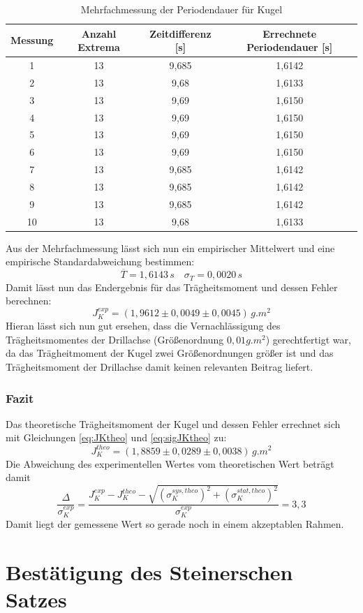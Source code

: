 \documentclass[12pt,a4paper]{article}
\begin{document}
\begin{table}
\caption{Mehrfachmessung der Periodendauer für Kugel}
\label{tab:Kugel_Periodendauern}
\begin{center}
\begin{tabular}{|c|c|c|c|}
\hline 
Messung & Anzahl Extrema & Zeitdifferenz [s] & Errechnete Periodendauer [s] \\ 
\hline 
1 & 13 & 9,685 & 1,6142 \\ 
\hline 
2 & 13 & 9,68 & 1,6133 \\ 
\hline 
3 & 13 & 9,69 & 1,6150 \\ 
\hline 
4 & 13 & 9,69 & 1,6150 \\ 
\hline 
5 & 13 & 9,69 & 1,6150 \\ 
\hline 
6 & 13 & 9,69 & 1,6150 \\ 
\hline 
7 & 13 & 9,685 & 1,6142 \\ 
\hline 
8 & 13 & 9,685 & 1,6142 \\ 
\hline 
9 & 13 & 9,685 & 1,6142 \\ 
\hline 
10 & 13 & 9,68 & 1,6133 \\ 
\hline 
\end{tabular} 
\end{center}
\end{table}

Aus der Mehrfachmessung lässt sich nun ein empirischer Mittelwert und eine empirische Standardabweichung bestimmen:
\[\overline{T} = 1,6143 \,s \quad \sigma_T = 0,0020 \, s \]
Damit lässt nun das Endergebnis für das Trägheitsmoment und dessen Fehler berechnen:
\[J_K^{exp} = (1,9612 \pm 0,0049 \pm 0,0045) \, \si{g.m ^2} \]
Hieran lässt sich nun gut ersehen, dass die Vernachlässigung des Trägheitsmomentes der Drillachse (Größenordnung $0,01\si{g.m ^2}$) gerechtfertigt war, da das Trägheitmoment der Kugel zwei Größenordnungen größer ist und das Trägheitsmoment der Drillachse damit keinen relevanten Beitrag liefert.

\subsubsection{Fazit}
Das theoretische Trägheitsmoment der Kugel und dessen Fehler errechnet sich mit Gleichungen \ref{eq:JKtheo} und \ref{eq:sigJKtheo} zu:
\[J_K^{theo} = (1,8859 \pm 0,0289 \pm 0,0038) \, \si{g.m ^2} \]
Die Abweichung des experimentellen Wertes vom theoretischen Wert beträgt damit 
\[\dfrac{\Delta}{\sigma _K^{exp}} = \dfrac{J_K^{exp} - J_K^{theo} - \sqrt{\left( \sigma _K^{sys,theo}\right) ^2 + \left( \sigma _K^{stat,theo}\right) ^2}}{\sigma _K^{exp}} = 3,3 \]
Damit liegt der gemessene Wert so gerade noch in einem akzeptablen Rahmen.

\section{Bestätigung des Steinerschen Satzes}
\end{document}
